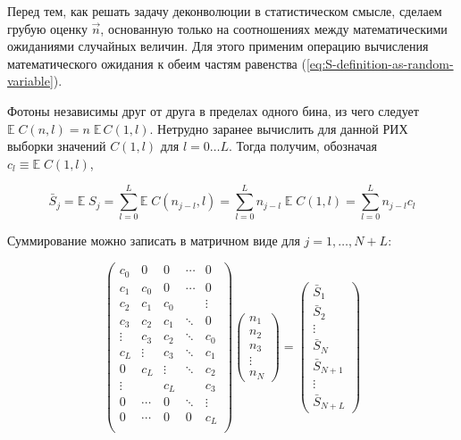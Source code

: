 \documentclass[12pt]{book}
\begin{document}
	Перед тем, как решать задачу деконволюции в статистическом смысле, сделаем грубую оценку $\vec{n}$, основанную только на соотношениях между математическими ожиданиями случайных величин. Для этого применим операцию вычисления математического ожидания к обеим частям равенства (\ref{eq:S-definition-as-random-variable}).
	
	Фотоны независимы друг от друга в пределах одного бина, из чего следует $ \mathbb{E} \; C(n, l) = n \; \mathbb{E} \, C(1, l)$. Нетрудно заранее вычислить для данной РИХ выборки значений $C(1, l)$ для $l = 0 \ldots L$. Тогда получим, обозначая $c_l \equiv \mathbb{E} \; C(1, l)$,
	
	\begin{equation}
		\bar{S}_j = \mathbb{E} \; S_j = \sum_{l=0}^{L} \mathbb{E} \; C(n_{j-l}, l) = \sum_{l=0}^{L} n_{j-l} \; \mathbb{E} \; C(1, l) = \sum_{l=0}^{L} n_{j-l} c_l
	\end{equation}

	Суммирование можно записать в матричном виде для $j = 1, \ldots, N + L$:
	
	\begin{equation}
		\begin{pmatrix} 
			c_0   &  0   &  0   &\dotsm&  0     \\
			c_1   & c_0  &  0   &\dotsm&  0     \\
			c_2   & c_1  & c_0  &      & \vdots \\
			c_3   & c_2  & c_1  &\ddots&  0     \\
     	    \vdots& c_3  & c_2  &\ddots&  c_0   \\
			c_L   &\vdots& c_3  &\ddots&  c_1   \\
			0     & c_L  &\vdots&\ddots&  c_2   \\
			\vdots&      & c_L  &      &  c_3   \\
			0     &\dotsm&  0   &\ddots& \vdots \\
			0     &\dotsm& 0    &   0  &  c_L   \\
		\end{pmatrix}
		\begin{pmatrix} 
			n_1 \\ n_2 \\ n_3 \\ \vdots \\ n_N
		\end{pmatrix}
		=
		\begin{pmatrix} 
			\bar{S}_1 \\ \bar{S}_2 \\
			\vdots \\
			\bar{S}_N \\ \bar{S}_{N+1} \\
			\vdots \\
			\bar{S}_{N+L}
		\end{pmatrix}
		\label{eq:mean-vector-calculation}
	\end{equation}
\end{document}
